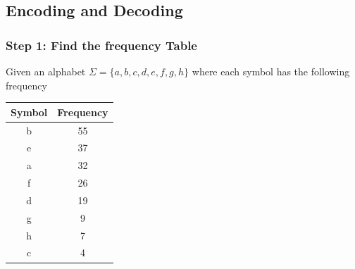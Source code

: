 \documentclass{beamer}
\begin{document}
\subsection{Encoding and Decoding}
\begin{frame}
    \frametitle{Step 1: Find the frequency Table}
    Given an alphabet $\Sigma =\{a, b, c, d, e, f, g, h\}$ where each symbol has the following frequency\\
    \begin{center}
        \begin{tabular}{ |c|c| } 
            \hline
            Symbol & Frequency \\ 
            \hline
            b & 55 \\
            e & 37 \\
            a & 32 \\ 
            f & 26 \\
            d & 19 \\
            g & 9 \\
            h & 7 \\ 
            c & 4 \\ 
            \hline
        \end{tabular}    
    \end{center}
\end{frame}
\end{document}
